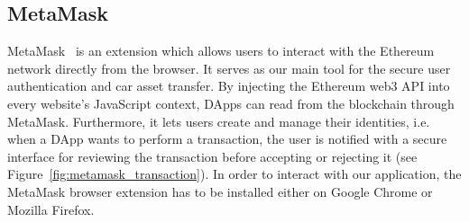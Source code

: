 \clearpage

\subsection{MetaMask}
MetaMask~\cite{MetaMask} is an extension which allows users to interact with the Ethereum network directly from the browser. It serves as our main tool for the secure user authentication and car asset transfer. By injecting the Ethereum web3 API into every website's JavaScript context, DApps can read from the blockchain through MetaMask. Furthermore, it lets users create and manage their identities, i.e. when a DApp wants to perform a transaction, the user is notified with a secure interface for reviewing the transaction before accepting or rejecting it (see Figure~\ref{fig:metamask_transaction}). In order to interact with our application, the MetaMask browser extension has to be installed either on Google Chrome or Mozilla Firefox.

